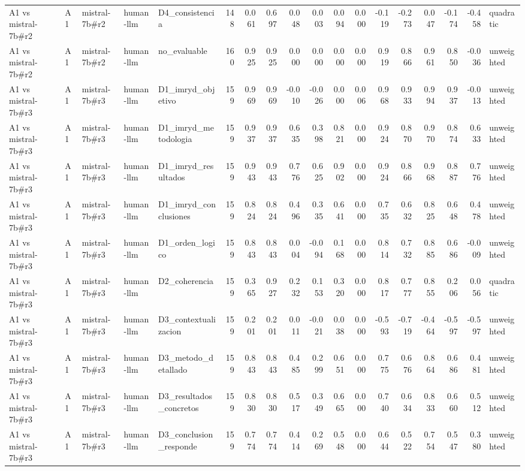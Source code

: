 \begin{table}
{\begin{tabular}{lllllrrrrrrrrrrrrl}
A1 vs mistral-7b\#r2 & A1 & mistral-7b\#r2 & human-llm & D4\_consistencia & 148 & 0.061 & 0.697 & 0.048 & 0.003 & 0.094 & 0.000 & -0.119 & -0.273 & 0.047 & -0.174 & -0.458 & quadratic \\
A1 vs mistral-7b\#r2 & A1 & mistral-7b\#r2 & human-llm & no\_evaluable & 160 & 0.925 & 0.925 & 0.000 & 0.000 & 0.000 & 0.000 & 0.919 & 0.866 & 0.961 & 0.850 & -0.036 & unweighted \\
A1 vs mistral-7b\#r3 & A1 & mistral-7b\#r3 & human-llm & D1\_imryd\_objetivo & 159 & 0.969 & 0.969 & -0.010 & -0.026 & 0.000 & 0.006 & 0.968 & 0.933 & 0.994 & 0.937 & -0.013 & unweighted \\
A1 vs mistral-7b\#r3 & A1 & mistral-7b\#r3 & human-llm & D1\_imryd\_metodologia & 159 & 0.937 & 0.937 & 0.635 & 0.398 & 0.821 & 0.000 & 0.924 & 0.870 & 0.970 & 0.874 & 0.633 & unweighted \\
A1 vs mistral-7b\#r3 & A1 & mistral-7b\#r3 & human-llm & D1\_imryd\_resultados & 159 & 0.943 & 0.943 & 0.776 & 0.625 & 0.902 & 0.000 & 0.924 & 0.866 & 0.968 & 0.887 & 0.776 & unweighted \\
A1 vs mistral-7b\#r3 & A1 & mistral-7b\#r3 & human-llm & D1\_imryd\_conclusiones & 159 & 0.824 & 0.824 & 0.496 & 0.335 & 0.641 & 0.000 & 0.735 & 0.632 & 0.825 & 0.648 & 0.478 & unweighted \\
A1 vs mistral-7b\#r3 & A1 & mistral-7b\#r3 & human-llm & D1\_orden\_logico & 159 & 0.843 & 0.843 & 0.004 & -0.094 & 0.168 & 0.000 & 0.814 & 0.732 & 0.885 & 0.686 & -0.009 & unweighted \\
A1 vs mistral-7b\#r3 & A1 & mistral-7b\#r3 & human-llm & D2\_coherencia & 159 & 0.365 & 0.927 & 0.232 & 0.153 & 0.320 & 0.000 & 0.817 & 0.777 & 0.855 & 0.206 & 0.056 & quadratic \\
A1 vs mistral-7b\#r3 & A1 & mistral-7b\#r3 & human-llm & D3\_contextualizacion & 159 & 0.201 & 0.201 & 0.011 & -0.021 & 0.038 & 0.000 & -0.593 & -0.719 & -0.464 & -0.597 & -0.597 & unweighted \\
A1 vs mistral-7b\#r3 & A1 & mistral-7b\#r3 & human-llm & D3\_metodo\_detallado & 159 & 0.843 & 0.843 & 0.485 & 0.299 & 0.651 & 0.000 & 0.775 & 0.676 & 0.864 & 0.686 & 0.481 & unweighted \\
A1 vs mistral-7b\#r3 & A1 & mistral-7b\#r3 & human-llm & D3\_resultados\_concretos & 159 & 0.830 & 0.830 & 0.517 & 0.349 & 0.665 & 0.000 & 0.740 & 0.634 & 0.833 & 0.660 & 0.512 & unweighted \\
A1 vs mistral-7b\#r3 & A1 & mistral-7b\#r3 & human-llm & D3\_conclusion\_responde & 159 & 0.774 & 0.774 & 0.414 & 0.269 & 0.548 & 0.000 & 0.644 & 0.522 & 0.754 & 0.547 & 0.380 & unweighted \\

\end{tabular}}
\end{table}
